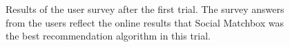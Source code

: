 \begin{figure}[t!]
\hspace{-6mm} 
\hspace{-6mm} 
\caption{Results of the user survey after the first trial. The survey answers from the users reflect the online results that Social Matchbox was the best recommendation algorithm in this trial.}
\label{fig:survey1}
\end{figure}
